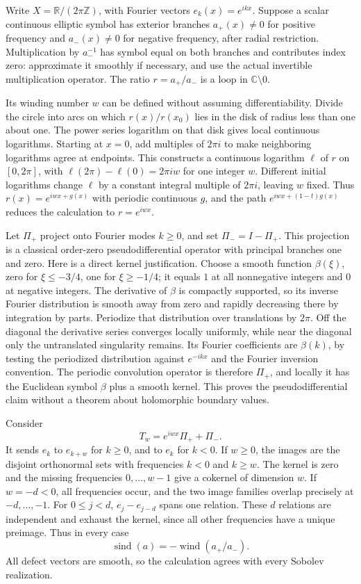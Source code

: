 \documentclass[
  11pt,
]{article}
\begin{document}
Write \(X=\mathbb R/(2\pi\mathbb Z)\), with Fourier vectors
\(e_k(x)=e^{ikx}\). Suppose a scalar continuous elliptic symbol has
exterior branches \(a_+(x)\ne0\) for positive frequency and
\(a_-(x)\ne0\) for negative frequency, after radial restriction.
Multiplication by \(a_-^{-1}\) has symbol equal on both branches and
contributes index zero: approximate it smoothly if necessary, and use
the actual invertible multiplication operator. The ratio \(r=a_+/a_-\)
is a loop in \(\mathbb C\setminus0\).

Its winding number \(w\) can be defined without assuming
differentiability. Divide the circle into arcs on which \(r(x)/r(x_0)\)
lies in the disk of radius less than one about one. The power series
logarithm on that disk gives local continuous logarithms. Starting at
\(x=0\), add multiples of \(2\pi i\) to make neighboring logarithms
agree at endpoints. This constructs a continuous logarithm \(\ell\) of
\(r\) on \([0,2\pi]\), with \(\ell(2\pi)-\ell(0)=2\pi i w\) for one
integer \(w\). Different initial logarithms change \(\ell\) by a
constant integral multiple of \(2\pi i\), leaving \(w\) fixed. Thus
\(r(x)=e^{iwx+g(x)}\) with periodic continuous \(g\), and the path
\(e^{iwx+(1-t)g(x)}\) reduces the calculation to \(r=e^{iwx}\).

Let \(\Pi_+\) project onto Fourier modes \(k\geq0\), and set
\(\Pi_-=I-\Pi_+\). This projection is a classical order-zero
pseudodifferential operator with principal branches one and zero. Here
is a direct kernel justification. Choose a smooth function
\(\beta(\xi)\), zero for \(\xi\leq-3/4\), one for \(\xi\geq-1/4\); it
equals \(1\) at all nonnegative integers and \(0\) at negative integers.
The derivative of \(\beta\) is compactly supported, so its inverse
Fourier distribution is smooth away from zero and rapidly decreasing
there by integration by parts. Periodize that distribution over
translations by \(2\pi\). Off the diagonal the derivative series
converges locally uniformly, while near the diagonal only the
untranslated singularity remains. Its Fourier coefficients are
\(\beta(k)\), by testing the periodized distribution against
\(e^{-ikx}\) and the Fourier inversion convention. The periodic
convolution operator is therefore \(\Pi_+\), and locally it has the
Euclidean symbol \(\beta\) plus a smooth kernel. This proves the
pseudodifferential claim without a theorem about holomorphic boundary
values.

Consider \[
T_w=e^{iwx}\Pi_++\Pi_-.
\tag{I27}
\] It sends \(e_k\) to \(e_{k+w}\) for \(k\geq0\), and to \(e_k\) for
\(k<0\). If \(w\geq0\), the images are the disjoint orthonormal sets
with frequencies \(k<0\) and \(k\geq w\). The kernel is zero and the
missing frequencies \(0,\ldots,w-1\) give a cokernel of dimension \(w\).
If \(w=-d<0\), all frequencies occur, and the two image families overlap
precisely at \(-d,\ldots,-1\). For \(0\leq j<d\), \(e_j-e_{j-d}\) spans
one relation. These \(d\) relations are independent and exhaust the
kernel, since all other frequencies have a unique preimage. Thus in
every case \[
\operatorname{sind}(a)=-\operatorname{wind}(a_+/a_-).
\tag{I28}
\] All defect vectors are smooth, so the calculation agrees with every
Sobolev realization.
\end{document}

